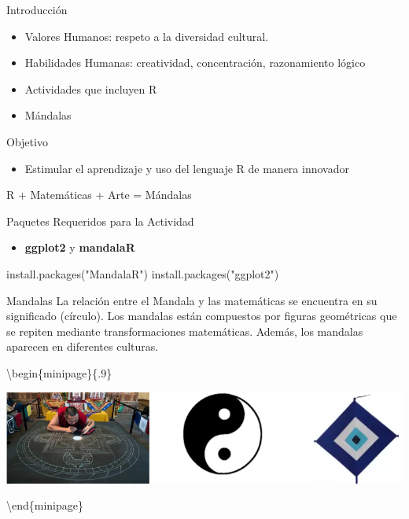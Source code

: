 \documentclass[
  ignorenonframetext,
]{beamer}
\newenvironment{Shaded}{\begin{snugshade}}{\end{snugshade}}
\newcommand{\FunctionTok}[1]{\textcolor[rgb]{0.28,0.35,0.67}{#1}}
\newcommand{\NormalTok}[1]{\textcolor[rgb]{0.00,0.23,0.31}{#1}}
\newcommand{\StringTok}[1]{\textcolor[rgb]{0.13,0.47,0.30}{#1}}
\providecommand{\tightlist}{%
  \setlength{\itemsep}{0pt}\setlength{\parskip}{0pt}}\usepackage{longtable,booktabs,array}
\begin{document}
\begin{frame}{Introducción}
\protect\hypertarget{introducciuxf3n}{}
\begin{itemize}
\tightlist
\item
  Valores Humanos: respeto a la diversidad cultural.
\item
  Habilidades Humanas: creatividad, concentración, razonamiento lógico
\item
  Actividades que incluyen R
\item
  Mándalas
\end{itemize}
\end{frame}

\begin{frame}{Objetivo}
\protect\hypertarget{objetivo}{}
\begin{itemize}
\tightlist
\item
  Estimular el aprendizaje y uso del lenguaje R de manera innovador
\end{itemize}

\textrm{\large{R + Matemáticas + Arte = Mándalas}}
\end{frame}

\begin{frame}[fragile]{Paquetes Requeridos para la Actividad}
\protect\hypertarget{paquetes-requeridos-para-la-actividad}{}
\begin{itemize}
\tightlist
\item
  \textbf{ggplot2} y \textbf{mandalaR}
\end{itemize}

\begin{Shaded}
\begin{Highlighting}[]
    \FunctionTok{install.packages}\NormalTok{(}\StringTok{"MandalaR"}\NormalTok{)}
    \FunctionTok{install.packages}\NormalTok{(}\StringTok{"ggplot2"}\NormalTok{)}
\end{Highlighting}
\end{Shaded}
\end{frame}

\begin{frame}{Mandalas}
\protect\hypertarget{mandalas}{}
La relación entre el Mandala y las matemáticas se encuentra en su
significado (círculo). Los mandalas están compuestos por figuras
geométricas que se repiten mediante transformaciones matemáticas.
Además, los mandalas aparecen en diferentes culturas.

\textbackslash begin\{minipage\}\{.9\textwidth\} \center

\includegraphics[width=1\textwidth,height=\textheight]{FigurasLatinR2023/culturas_mandalas.png}

\textbackslash end\{minipage\}
\end{frame}
\end{document}
